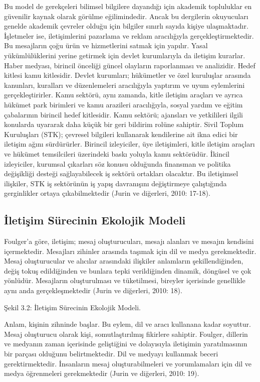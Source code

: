 \documentclass[
]{book}
\begin{document}
Bu model de gerekçeleri bilimsel bilgilere dayandığı için akademik topluluklar en güvenilir kaynak olarak görülme eğilimindedir. Ancak bu dergilerin okuyucuları genelde akademik çevreler olduğu için bilgiler sınırlı sayıda kişiye ulaşmaktadır. İşletmeler ise, iletişimlerini pazarlama ve reklam aracılığıyla gerçekleştirmektedir. Bu mesajların çoğu ürün ve hizmetlerini satmak için yapılır. Yasal yükümlülüklerini yerine getirmek için devlet kurumlarıyla da iletişim kurarlar. Haber medyası, birincil önceliği güncel olayların raporlanması ve analizidir. Hedef kitlesi kamu kitlesidir. Devlet kurumları; hükümetler ve özel kuruluşlar arasında kanunları, kuralları ve düzenlemeleri aracılığıyla yaptırım ve uyum eylemlerini gerçekleştirirler. Kamu sektörü, aynı zamanda, kitle iletişim araçları ve ayrıca hükümet park birimleri ve kamu arazileri aracılığıyla, sosyal yardım ve eğitim çabalarının birincil hedef kitlesidir. Kamu sektörü; ajansları ve yetkilileri ilgili konularda uyararak daha küçük bir geri bildirim rolüne sahiptir. Sivil Toplum Kuruluşları (STK); çevresel bilgileri kullanarak kendilerine ait ikna edici bir iletişim ağını sürdürürler. Birincil izleyiciler, üye iletişimleri, kitle iletişim araçları ve hükümet temsilcileri üzerindeki baskı yoluyla kamu sektörüdür. İkincil izleyiciler, kurumsal çıkarları söz konusu olduğunda finansman ve politika değişikliği desteği sağlayabilecek iş sektörü ortakları olacaktır. Bu iletişimsel ilişkiler, STK iş sektörünün iş yapış davranışını değiştirmeye çalıştığında gerginlikler ortaya çıkabilmektedir (Jurin ve diğerleri, 2010: 17-18).

\hypertarget{iletiux15fim-suxfcrecinin-ekolojik-modeli}{%
\subsection{İletişim Sürecinin Ekolojik Modeli}\label{iletiux15fim-suxfcrecinin-ekolojik-modeli}}

Foulger'a göre, iletişim; mesaj oluşturucuları, mesajı alanları ve mesajın kendisini içermektedir. Mesajları zihinler arasında taşımak için dil ve medya gerekmektedir. Mesaj oluşturucular ve alıcılar arasındaki ilişkiler anlamların şekillendiğinden, değiş tokuş edildiğinden ve bunlara tepki verildiğinden dinamik, döngüsel ve çok yönlüdür. Mesajların oluşturulması ve tüketilmesi, bireyler içerisinde genellikle aynı anda gerçekleşmektedir (Jurin ve diğerleri, 2010: 18).

Şekil 3.2: İletişim Sürecinin Ekolojik Modeli.

Anlam, kişinin zihninde başlar. Bu eylem, dil ve aracı kullanana kadar soyuttur. Mesaj oluşturucu olarak kişi, somutlaştırılmış fikirlere sahiptir. Foulger, dillerin ve medyanın zaman içerisinde geliştiğini ve dolayısıyla iletişimin yaratılmasının bir parçası olduğunu belirtmektedir. Dil ve medyayı kullanmak beceri gerektirmektedir. İnsanların mesaj oluşturabilmeleri ve yorumlamaları için dil ve medya öğrenmeleri gerekmektedir (Jurin ve diğerleri, 2010: 19).
\end{document}

